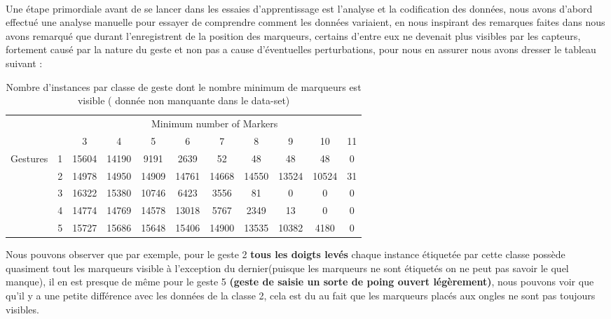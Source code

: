 \paragraph{}
Une étape primordiale avant de se lancer dans les essaies d'apprentissage est l'analyse et la codification des données, nous avons d'abord effectué une analyse manuelle pour essayer de comprendre comment les données variaient, en nous inspirant des remarques faites dans \cite{datasetDetails} nous avons remarqué que durant l'enregistrent de la position des marqueurs, certains d'entre eux ne devenait plus visibles par les capteurs, fortement causé par la nature du geste et non pas a cause d'éventuelles perturbations, pour nous en assurer nous avons dresser le tableau suivant : 
\begin{table}[H]
	\centering
	\begin{tabular}{cc|c|c|c|c|c|c|c|c|c|}
		\cline{3-11}
		&           & \multicolumn{9}{c|}{Minimum number of Markers}                     \\ \cline{3-11} 
		& \textbf{} & 3     & 4     & 5     & 6     & 7     & 8     & 9     & 10    & 11 \\ \hline
		\multicolumn{1}{|c|}{\multirow{5}{*}{Gestures}} & 1         & 15604 & 14190 & 9191  & 2639  & 52    & 48    & 48    & 48    & 0  \\ \cline{2-11} 
		\multicolumn{1}{|c|}{}                          & 2         & 14978 & 14950 & 14909 & 14761 & 14668 & 14550 & 13524 & 10524 & 31 \\ \cline{2-11} 
		\multicolumn{1}{|c|}{}                          & 3         & 16322 & 15380 & 10746 & 6423  & 3556  & 81    & 0     & 0     & 0  \\ \cline{2-11} 
		\multicolumn{1}{|c|}{}                          & 4         & 14774 & 14769 & 14578 & 13018 & 5767  & 2349  & 13    & 0     & 0  \\ \cline{2-11} 
		\multicolumn{1}{|c|}{}                          & 5         & 15727 & 15686 & 15648 & 15406 & 14900 & 13535 & 10382 & 4180  & 0  \\ \hline
	\end{tabular}
	\caption{Nombre d'instances par classe de geste dont le nombre minimum de marqueurs est visible ( donnée non manquante dans le data-set)}
	\label{my-label}
\end{table}
\par 
Nous pouvons observer que par exemple, pour le geste 2 \textbf{tous les doigts levés} chaque instance étiquetée par cette classe possède quasiment 
tout les marqueurs visible à l'exception du dernier(puisque les marqueurs ne sont étiquetés on ne peut pas savoir le quel manque), il en est presque de même pour le geste 5 \textbf{(geste de saisie un sorte de poing ouvert légèrement)}, nous pouvons voir que qu'il y a une petite différence avec les données de la classe 2, cela est du au fait que les marqueurs placés aux ongles ne sont pas toujours visibles.\par 
